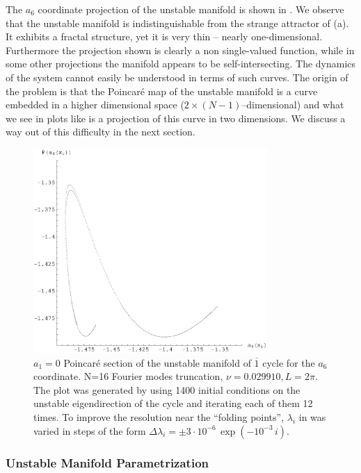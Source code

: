 \documentclass[pre,preprint,groupedaddress,showpacs,showkeys]{revtex4}
\begin{document}
 The $a_6$ coordinate projection of the
 unstable manifold is shown in .
 We observe that the unstable manifold is indistinguishable from the
 strange attractor of (a). It exhibits a fractal structure, yet it is very thin -- nearly
 one-dimensional. Furthermore the projection shown is clearly
 a non single-valued function, while in some other projections
 the manifold appears to be self-intersecting. The dynamics of the system cannot easily be
 understood in terms of such curves. The origin of the problem is that
 the Poincar\'e map of the unstable manifold is a curve embedded in a
 higher dimensional space  ($ 2\times(N-1)$--dimensional) and what we see in plots like
  is a projection of this curve in two
 dimensions. We discuss a way out of this difficulty in the
 next section.

 \begin{figure}[b!]
     \includegraphics[width=3.5in]{figs/manifold.eps}
     \caption{ $a_1=0$ Poincar\'e section of the unstable manifold of $ \overline{1}$   cycle  for the $a_6$ coordinate.
     N=16 Fourier modes truncation, $\nu=0.029910, L=2\pi$. The
     plot was generated by using 1400 initial conditions on the
     unstable eigendirection of the cycle %
     and iterating each of them
     12 times. To improve the resolution near the ``folding points'',
     $\lambda_i$ in  was varied in
     steps of the form $\Delta\lambda_i=\pm 3\cdot 10^{-6}\, \exp(-10^{-3}\,i)$.%
     }
 \label{fig:Manifold}
 \end{figure}



 \subsubsection{Unstable Manifold Parametrization}
\end{document}
